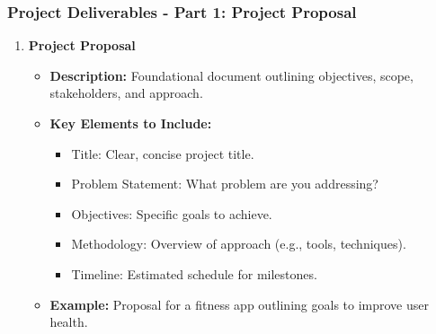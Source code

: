 \documentclass[aspectratio=169]{beamer}
\begin{document}
\begin{frame}[fragile]
    \frametitle{Project Deliverables - Part 1: Project Proposal}
    \begin{enumerate}
        \item \textbf{Project Proposal}
        \begin{itemize}
            \item \textbf{Description:} Foundational document outlining objectives, scope, stakeholders, and approach.
            \item \textbf{Key Elements to Include:}
            \begin{itemize}
                \item Title: Clear, concise project title.
                \item Problem Statement: What problem are you addressing?
                \item Objectives: Specific goals to achieve.
                \item Methodology: Overview of approach (e.g., tools, techniques).
                \item Timeline: Estimated schedule for milestones.
            \end{itemize}
            \item \textbf{Example:} Proposal for a fitness app outlining goals to improve user health.
        \end{itemize}
    \end{enumerate}
\end{frame}
\end{document}
